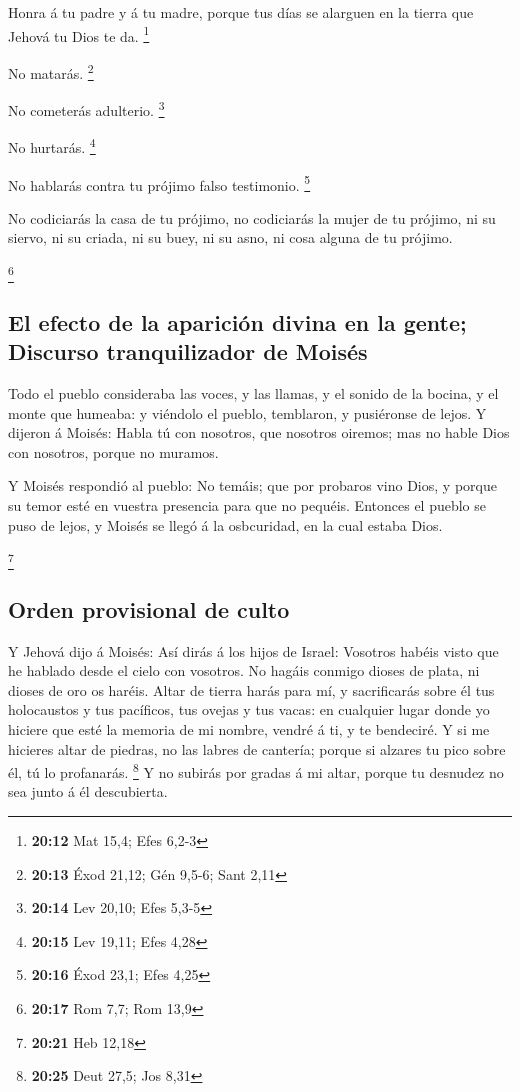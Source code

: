  Honra á tu padre y á tu madre, porque tus días se
alarguen en la tierra que Jehová tu Dios te da. \footnote{\textbf{20:12}
  Mat 15,4; Efes 6,2-3}

 No matarás. \footnote{\textbf{20:13} Éxod 21,12; Gén
  9,5-6; Sant 2,11}

 No cometerás adulterio. \footnote{\textbf{20:14} Lev
  20,10; Efes 5,3-5}

 No hurtarás. \footnote{\textbf{20:15} Lev 19,11; Efes
  4,28}

 No hablarás contra tu prójimo falso testimonio.
\footnote{\textbf{20:16} Éxod 23,1; Efes 4,25}

 No codiciarás la casa de tu prójimo, no codiciarás la
mujer de tu prójimo, ni su siervo, ni su criada, ni su buey, ni su asno,
ni cosa alguna de tu prójimo.

\footnote{\textbf{20:17} Rom 7,7; Rom 13,9}

\hypertarget{el-efecto-de-la-apariciuxf3n-divina-en-la-gente-discurso-tranquilizador-de-moisuxe9s}{%
\subsection{El efecto de la aparición divina en la gente; Discurso
tranquilizador de
Moisés}\label{el-efecto-de-la-apariciuxf3n-divina-en-la-gente-discurso-tranquilizador-de-moisuxe9s}}

 Todo el pueblo consideraba las voces, y las llamas, y el
sonido de la bocina, y el monte que humeaba: y viéndolo el pueblo,
temblaron, y pusiéronse de lejos.  Y dijeron á Moisés:
Habla tú con nosotros, que nosotros oiremos; mas no hable Dios con
nosotros, porque no muramos.

 Y Moisés respondió al pueblo: No temáis; que por
probaros vino Dios, y porque su temor esté en vuestra presencia para que
no pequéis.  Entonces el pueblo se puso de lejos, y
Moisés se llegó á la osbcuridad, en la cual estaba Dios.

\footnote{\textbf{20:21} Heb 12,18}

\hypertarget{orden-provisional-de-culto}{%
\subsection{Orden provisional de
culto}\label{orden-provisional-de-culto}}

 Y Jehová dijo á Moisés: Así dirás á los hijos de Israel:
Vosotros habéis visto que he hablado desde el cielo con vosotros.
 No hagáis conmigo dioses de plata, ni dioses de oro os
haréis.  Altar de tierra harás para mí, y sacrificarás
sobre él tus holocaustos y tus pacíficos, tus ovejas y tus vacas: en
cualquier lugar donde yo hiciere que esté la memoria de mi nombre,
vendré á ti, y te bendeciré.  Y si me hicieres altar de
piedras, no las labres de cantería; porque si alzares tu pico sobre él,
tú lo profanarás. \footnote{\textbf{20:25} Deut 27,5; Jos 8,31}
 Y no subirás por gradas á mi altar, porque tu desnudez
no sea junto á él descubierta.

